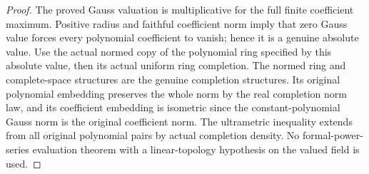\begin{proof}
The proved Gauss valuation is multiplicative for the full finite
coefficient maximum. Positive radius and faithful coefficient norm
imply that zero Gauss value forces every polynomial coefficient
to vanish; hence it is a genuine absolute value. Use the actual
normed copy of the polynomial ring specified by this absolute
value, then its actual uniform ring completion. The normed ring
and complete-space structures are the genuine completion
structures. Its original polynomial embedding preserves the whole
norm by the real completion norm law, and its coefficient embedding
is isometric since the constant-polynomial Gauss norm is the
original coefficient norm. The ultrametric inequality extends
from all original polynomial pairs by actual completion density.
No formal-power-series evaluation theorem with a linear-topology
hypothesis on the valued field is used.
\end{proof}

